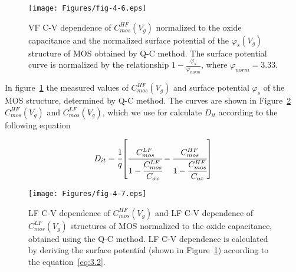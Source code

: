 \begin{figure}[h!]\centering
  \begin{minipage}[c]{\myfiguresize}
    \begin{center}
      \texttt{[image: Figures/fig-4-6.eps]}
      \caption[VF C-V dependence of $C_{mos}^{HF}(V_{g})$ and curve of
        the surface potential $\varphi_{s}(V_{g})$ of the MOS
        structure obtained using the Q-C method]{VF C-V dependence of
        $C_{mos}^{HF}(V_{g})$ normalized to the oxide capacitance and
        the normalized surface potential of the $\varphi_{s}(V_{g})$
        structure of MOS obtained by Q-C method. The surface potential
        curve is normalized by the relationship
        $1-\frac{\varphi_{s}}{\varphi_{norm}}$, where
        $\varphi_{norm}=3.33$.}\label{fig:4.6}
    \end{center}
  \end{minipage}
\end{figure}

In figure~\ref{fig:4.6} the measured values of $C_{mos}^{HF}(V_{g})$
and surface potential $\varphi_{s}$ of the MOS structure, determined
by Q-C method. The curves are shown in Figure~\ref{fig:4.7}
$C_{mos}^{HF}(V_{g})$ and $C_{mos}^{LF}(V_{g})$, which we use for
calculate $D_{it}$ according to the following equation~\cite{4.15}

\begin{equation}\label{eq:4.15}
  D_{it} = {\cfrac{1}{q}} {\left[\cfrac{C_{mos}^{LF}}{1-\cfrac{C_{mos}^{LF}}{C_{ox}}}-\cfrac{C_{mos}^{HF}}{1-\cfrac{C_{mos}^{HF}}{C_{ox}}}\right]}
\end{equation}

\begin{figure}[h!]\centering
  \begin{minipage}[c]{\myfiguresize}
    \begin{center}
      \texttt{[image: Figures/fig-4-7.eps]}
      \caption[VF C-V dependence $C_{mos}^{HF} (V_{g})$ and LF C-V
        dependence $C_{mos}^{LF} (V_{g})$ of the MOS structure
        normalized to the oxide capacitance, obtained using the Q-C
        method]{LF C-V dependence of $C_{mos}^{HF} (V_{g})$ and LF C-V
        dependence of $C_{mos}^{LF} (V_{g})$ structures of MOS
        normalized to the oxide capacitance, obtained using the Q-C
        method.  LF C-V dependence is calculated by deriving the
        surface potential (shown in Figure~\ref{fig:4.6}) according to
        the equation~\ref{eq:3.2}.}\label{fig:4.7}
    \end{center}
  \end{minipage}
\end{figure}

